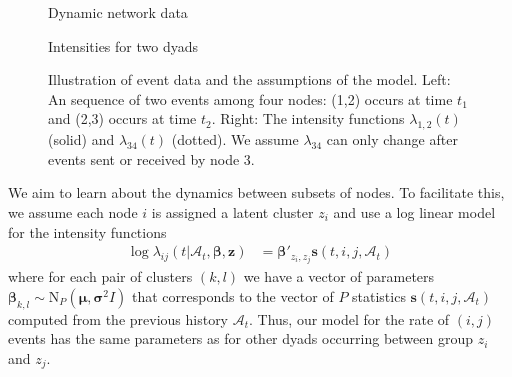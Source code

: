 \begin{figure}
\centering
\begin{minipage}[b]{0.45\linewidth}
  \caption{Dynamic network data}
\end{minipage}
\begin{minipage}[b]{0.45\linewidth}
\caption{Intensities for two dyads}
\end{minipage}
\caption[]{Illustration of event data and the assumptions of the model.  Left: An sequence of two events among four nodes: (1,2) occurs at time $t_1$ and (2,3) occurs at time $t_2$.  Right: The intensity functions $\lambda_{1,2}(t)$ (solid) and $\lambda_{34}(t)$ (dotted).  We assume $\lambda_{34}$ can only change after events sent or received by node 3.\footnotemark }
\label{fig:example}
\end{figure}

We aim to learn about the dynamics between subsets of nodes.   To facilitate this, we assume each node $i$ is assigned a latent cluster $z_i$ and use a log linear model for the intensity functions
\begin{align*}
\log \lambda_{ij}(t | \mathcal{A}_t,\mathbf{\beta},\mathbf{z}) &= \boldsymbol{\beta}'_{z_i,z_j} \mathbf{s}(t,i,j,\mathcal{A}_t)
\end{align*}
where for each pair of clusters $(k,l)$ we have a vector of parameters $\boldsymbol{\beta}_{k,l} \sim \mbox{N}_P(\boldsymbol{\mu},\boldsymbol{\sigma}^2I)$ that corresponds to the vector of $P$ statistics $\mathbf{s}(t,i,j,\mathcal{A}_t)$ computed from the previous history $\mathcal{A}_t$.
Thus, our model for the rate of $(i,j)$ events has the same parameters as for other dyads occurring between group $z_i$ and $z_j$.


